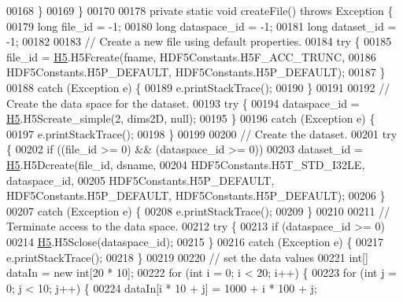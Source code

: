 \begin{DoxyCode}
00168         \}
00169     \}
00170 
00178     \textcolor{keyword}{private} \textcolor{keyword}{static} \textcolor{keywordtype}{void} createFile() throws Exception \{
00179         \textcolor{keywordtype}{long} file\_id = -1;
00180         \textcolor{keywordtype}{long} dataspace\_id = -1;
00181         \textcolor{keywordtype}{long} dataset\_id = -1;
00182 
00183         \textcolor{comment}{// Create a new file using default properties.}
00184         \textcolor{keywordflow}{try} \{
00185             file\_id = \hyperlink{namespace_h5}{H5}.H5Fcreate(fname, HDF5Constants.H5F\_ACC\_TRUNC,
00186                     HDF5Constants.H5P\_DEFAULT, HDF5Constants.H5P\_DEFAULT);
00187         \}
00188         \textcolor{keywordflow}{catch} (Exception e) \{
00189             e.printStackTrace();
00190         \}
00191 
00192         \textcolor{comment}{// Create the data space for the dataset.}
00193         \textcolor{keywordflow}{try} \{
00194             dataspace\_id = \hyperlink{namespace_h5}{H5}.H5Screate\_simple(2, dims2D, null);
00195         \}
00196         \textcolor{keywordflow}{catch} (Exception e) \{
00197             e.printStackTrace();
00198         \}
00199 
00200         \textcolor{comment}{// Create the dataset.}
00201         \textcolor{keywordflow}{try} \{
00202             \textcolor{keywordflow}{if} ((file\_id >= 0) && (dataspace\_id >= 0))
00203                 dataset\_id = \hyperlink{namespace_h5}{H5}.H5Dcreate(file\_id, dsname,
00204                         HDF5Constants.H5T\_STD\_I32LE, dataspace\_id,
00205                         HDF5Constants.H5P\_DEFAULT, HDF5Constants.H5P\_DEFAULT, HDF5Constants.H5P\_DEFAULT);
00206         \}
00207         \textcolor{keywordflow}{catch} (Exception e) \{
00208             e.printStackTrace();
00209         \}
00210 
00211         \textcolor{comment}{// Terminate access to the data space.}
00212         \textcolor{keywordflow}{try} \{
00213             \textcolor{keywordflow}{if} (dataspace\_id >= 0)
00214                 \hyperlink{namespace_h5}{H5}.H5Sclose(dataspace\_id);
00215         \}
00216         \textcolor{keywordflow}{catch} (Exception e) \{
00217             e.printStackTrace();
00218         \}
00219 
00220         \textcolor{comment}{// set the data values}
00221         \textcolor{keywordtype}{int}[] dataIn = \textcolor{keyword}{new} \textcolor{keywordtype}{int}[20 * 10];
00222         \textcolor{keywordflow}{for} (\textcolor{keywordtype}{int} i = 0; i < 20; i++) \{
00223             \textcolor{keywordflow}{for} (\textcolor{keywordtype}{int} j = 0; j < 10; j++) \{
00224                 dataIn[i * 10 + j] = 1000 + i * 100 + j;

\end{DoxyCode}
